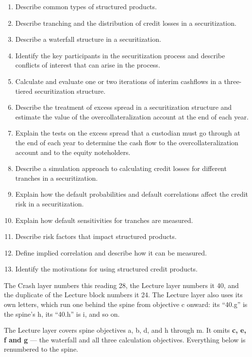 
\begin{crkeybox}
\begin{enumerate}[label=\textbf{\alph*.},leftmargin=2em]
\item Describe common types of structured products.
\item Describe tranching and the distribution of credit losses in a securitization.
\item Describe a waterfall structure in a securitization.
\item Identify the key participants in the securitization process and describe conflicts of interest that can arise in the process.
\item Calculate and evaluate one or two iterations of interim cashflows in a three-tiered securitization structure.
\item Describe the treatment of excess spread in a securitization structure and estimate the value of the overcollateralization account at the end of each year.
\item Explain the tests on the excess spread that a custodian must go through at the end of each year to determine the cash flow to the overcollateralization account and to the equity noteholders.
\item Describe a simulation approach to calculating credit losses for different tranches in a securitization.
\item Explain how the default probabilities and default correlations affect the credit risk in a securitization.
\item Explain how default sensitivities for tranches are measured.
\item Describe risk factors that impact structured products.
\item Define implied correlation and describe how it can be measured.
\item Identify the motivations for using structured credit products.
\end{enumerate}
\end{crkeybox}

\begin{crtrapbox}
The Crash layer numbers this reading 28, the Lecture layer numbers it 40, and the
duplicate of the Lecture block numbers it 24. The Lecture layer also uses its own
letters, which run one behind the spine from objective c onward: its ``40.g'' is
the spine's h, its ``40.h'' is i, and so on.

\smallskip
The Lecture layer covers spine objectives a, b, d, and h through m. It omits
\textbf{c, e, f and g} --- the waterfall and all three calculation objectives.
Everything below is renumbered to the spine.
\end{crtrapbox}

